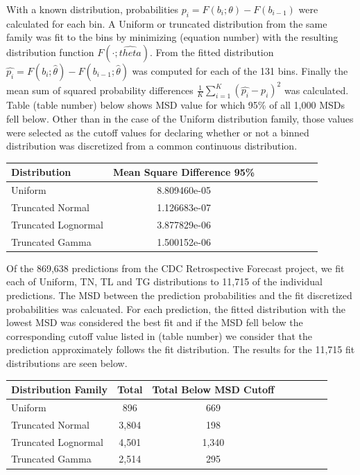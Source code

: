 \documentclass{article}\usepackage[]{graphicx}\usepackage[]{color}
\begin{document}
With a known distribution, probabilities $p_i =F(b_i; \theta) - F(b_{i-1})$ were
calculated for each bin. A Uniform or truncated distribution from the same
family was fit to the bins by minimizing (equation number) with the resulting
distribution function $F(\cdot; \hat{theta})$. From the fitted distribution
$\hat{p_i} = F(b_i; \hat{\theta}) - F(b_{i-1}; \hat{\theta})$ was computed for 
each of the 131 bins. Finally the mean sum of squared probability differences
$\frac{1}{K}\sum_{i=1}^K (\hat{p_i} - p_i)^2$ was calculated. Table (table number)
below shows MSD value for which 95\% of all 1,000 MSDs fell below. Other than in
the case of the Uniform distribution family, those values were selected as the 
cutoff values for declaring whether or not a binned distribution was discretized
from a common continuous distribution.


\begin{table}[h!]
  \centering
  \begin{tabular}{l*{6}{c}r}
  Distribution          & Mean Square Difference 95\%  \\
  \hline
  Uniform               & 8.809460e-05   \\
  Truncated Normal      & 1.126683e-07  \\
  Truncated Lognormal   & 3.877829e-06  \\
  Truncated Gamma       & 1.500152e-06  \\
  \end{tabular}
\end{table}




Of the 869,638 predictions from the CDC Retrospective Forecast project, we fit
each of Uniform, TN, TL and TG distributions to 11,715 of the individual 
predictions. The MSD between the prediction probabilities and the fit
discretized probabilities was calcuated. For each prediction, the fitted 
distribution with the lowest MSD was considered the best fit and if the MSD fell
below the corresponding cutoff value listed in (table number) we consider that 
the prediction approximately follows the fit distribution. The results for the
11,715 fit distributions are seen below.

\begin{table}[h!]
  \centering
  \begin{tabular}{l*{6}{c}r}
  Distribution Family   & Total    & Total Below MSD Cutoff \\
  \hline
  Uniform               & 896      & 669    \\
  Truncated Normal      & 3,804    & 198    \\
  Truncated Lognormal   & 4,501    & 1,340  \\
  Truncated Gamma       & 2,514    & 295    \\
  \end{tabular}
\end{table}
\end{document}
